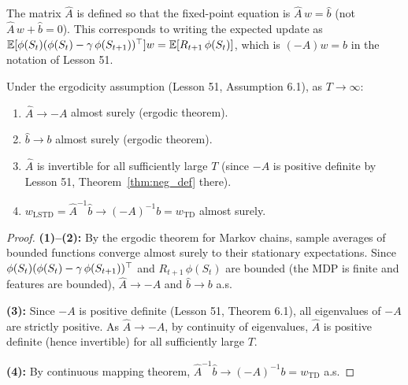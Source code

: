 \documentclass[11pt,a4paper]{article}
\begin{document}
\begin{remark}
\label{rem:sign}
The matrix $\hat{A}$ is defined so that the fixed-point equation is
$\hat{A}\,w = \hat{b}$ (not $\hat{A}\,w + \hat{b} = 0$). This
corresponds to writing the expected update as
$\mathbb{E}[\phi(S_t)(\phi(S_t) - \gamma\,\phi(S_{t+1}))^\top] w
= \mathbb{E}[R_{t+1}\,\phi(S_t)]$, which is $(-A)w = b$ in the notation
of Lesson 51.
\end{remark}

\begin{theorem}
\label{thm:lstd_consistency}
Under the ergodicity assumption (Lesson 51, Assumption 6.1), as
$T \to \infty$:
\begin{enumerate}
  \item $\hat{A} \to -A$ almost surely (ergodic theorem).
  \item $\hat{b} \to b$ almost surely (ergodic theorem).
  \item $\hat{A}$ is invertible for all sufficiently large $T$
    (since $-A$ is positive definite by Lesson 51,
    Theorem~\ref{thm:neg_def} there).
  \item $w_{\mathrm{LSTD}} = \hat{A}^{-1}\hat{b} \to (-A)^{-1}b
    = w_{\mathrm{TD}}$ almost surely.
\end{enumerate}
\end{theorem}

\begin{proof}
\textbf{(1)--(2):} By the ergodic theorem for Markov chains, sample
averages of bounded functions converge almost surely to their
stationary expectations. Since $\phi(S_t)(\phi(S_t)
- \gamma\,\phi(S_{t+1}))^\top$ and $R_{t+1}\,\phi(S_t)$ are
bounded (the MDP is finite and features are bounded), $\hat{A} \to -A$
and $\hat{b} \to b$ a.s.

\textbf{(3):} Since $-A$ is positive definite (Lesson 51,
Theorem 6.1), all eigenvalues of $-A$ are strictly positive. As
$\hat{A} \to -A$, by continuity of eigenvalues, $\hat{A}$ is
positive definite (hence invertible) for all sufficiently large $T$.

\textbf{(4):} By continuous mapping theorem,
$\hat{A}^{-1}\hat{b} \to (-A)^{-1}b = w_{\mathrm{TD}}$ a.s.
\end{proof}
\end{document}
